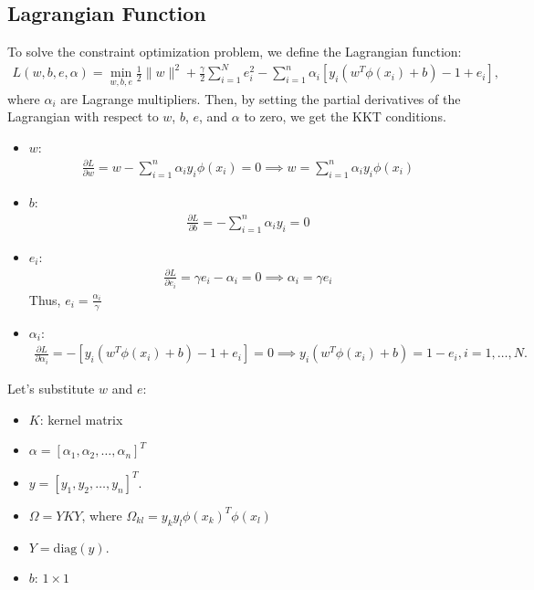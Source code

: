 \subsection{Lagrangian Function}
To solve the constraint optimization problem, we define the Lagrangian function: 
\begin{align*}
	L(w, b, e, \alpha) = \min_{w, b, e} \frac{1}{2} \lVert w\rVert^2 + \frac{\gamma}{2} \sum_{i=1}^N e_i^2 - \sum_{i=1}^n \alpha_i \left[ y_i (w^T \phi(x_i) + b) - 1 + e_i \right],
\end{align*}
where $\alpha_i$ are Lagrange multipliers. Then, by setting the partial derivatives of the Lagrangian with respect to $w$, $b$, $e$, and $\alpha$ to zero, we get the KKT conditions.

\begin{itemize}
	\item $w$: 
		\begin{align*}
		   \frac{\partial L}{\partial w} = w - \sum_{i=1}^n \alpha_i y_i \phi(x_i) = 0 \implies w = \sum_{i=1}^n \alpha_i y_i \phi(x_i)
		\end{align*}
	\item $b$:
		\begin{align*}
		   \frac{\partial L}{\partial b} = -\sum_{i=1}^n \alpha_i y_i = 0
		\end{align*}
\item $e_i$:
	\begin{align*}
	   \frac{\partial L}{\partial e_i} = \gamma e_i - \alpha_i = 0 \implies \alpha_i = \gamma e_i
	\end{align*}
	Thus, $e_i = \frac{\alpha_i}{\gamma}$
\item $\alpha_i$:
	\begin{align*}
	   \frac{\partial L}{\partial \alpha_i} = - \left[ y_i (w^T \phi(x_i) + b) - 1 + e_i \right] = 0 \implies y_i (w^T \phi(x_i) + b) = 1 - e_i, i=1,\dots, N.
	\end{align*}
\end{itemize}

Let's substitute $w$ and $e$:
\begin{itemize}
	\item $K$: kernel matrix
	\item $\alpha = [\alpha_1, \alpha_2, \ldots, \alpha_n]^T$
	\item $y = [y_1, y_2, \ldots, y_n]^T$.
	\item $\Omega = YKY$, where $\Omega_{kl}= y_ky_l\phi(x_k)^T\phi(x_l)$
	\item $Y = \text{diag}(y)$.
	\item $b$: $1\times 1$
\end{itemize}

